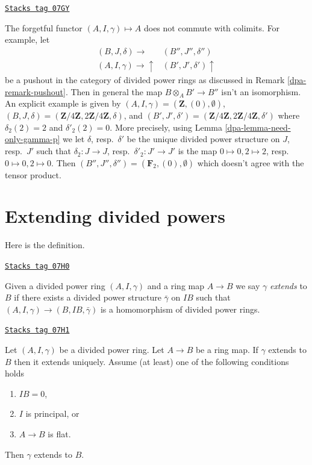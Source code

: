 \begin{remark}[Forgetful]
\label{dpa-remark-forgetful}
\href{https://stacks.math.columbia.edu/tag/07GY}{\texttt{Stacks tag 07GY}}

The forgetful functor $(A, I, \gamma) \mapsto A$ does not commute with
colimits. For example, let
$$
\begin{array}{cc}(B, J, \delta) \longrightarrow & (B'', J'', \delta'') \\ (A, I, \gamma) \longrightarrow\uparrow & (B', J', \delta') \uparrow\end{array}
$$
be a pushout in the category of divided power rings as discussed
in Remark \ref{dpa-remark-pushout}. Then in general the map
$B \otimes_A B' \to B''$ isn't an isomorphism.
An explicit example is given by
$(A, I, \gamma) = (\mathbf{Z}, (0), \emptyset)$,
$(B, J, \delta) = (\mathbf{Z}/4\mathbf{Z}, 2\mathbf{Z}/4\mathbf{Z}, \delta)$,
and
$(B', J', \delta') =
(\mathbf{Z}/4\mathbf{Z}, 2\mathbf{Z}/4\mathbf{Z}, \delta')$
where $\delta_2(2) = 2$ and $\delta'_2(2) = 0$.
More precisely, using Lemma \ref{dpa-lemma-need-only-gamma-p}
we let $\delta$, resp.\ $\delta'$ be the unique
divided power structure on $J$, resp.\ $J'$ such that
$\delta_2 : J \to J$, resp.\ $\delta'_2 : J' \to J'$
is the map $0 \mapsto 0, 2 \mapsto 2$, resp.\ $0 \mapsto 0, 2 \mapsto 0$.
Then $(B'', J'', \delta'') = (\mathbf{F}_2, (0), \emptyset)$
which doesn't agree with the tensor product.
\end{remark}

\section{Extending divided powers}
\label{dpa-section-extend}
Here is the definition.

\begin{definition}[Extends]
\label{dpa-definition-extends}
\href{https://stacks.math.columbia.edu/tag/07H0}{\texttt{Stacks tag 07H0}}

Given a divided power ring $(A, I, \gamma)$ and a ring map
$A \to B$ we say $\gamma$ {\it extends} to $B$ if there exists a
divided power structure $\bar \gamma$ on $IB$ such that
$(A, I, \gamma) \to (B, IB, \bar\gamma)$ is a homomorphism of
divided power rings.
\end{definition}

\begin{lemma}
\label{dpa-lemma-gamma-extends}
\href{https://stacks.math.columbia.edu/tag/07H1}{\texttt{Stacks tag 07H1}}

Let $(A, I, \gamma)$ be a divided power ring.
Let $A \to B$ be a ring map.
If $\gamma$ extends to $B$ then it extends uniquely.
Assume (at least) one of the following conditions holds
\begin{enumerate}
\item $IB = 0$,
\item $I$ is principal, or
\item $A \to B$ is flat.
\end{enumerate}
Then $\gamma$ extends to $B$.
\end{lemma}

